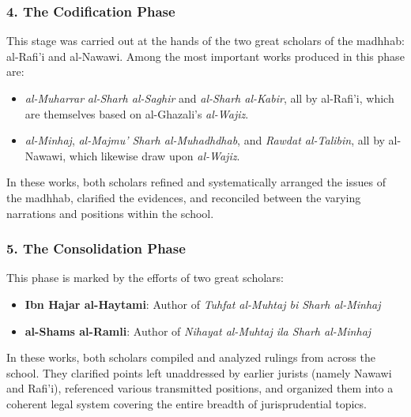 \documentclass[
  a4paper,
  DIV=11,
  numbers=noendperiod]{scrartcl}
\providecommand{\tightlist}{%
  \setlength{\itemsep}{0pt}\setlength{\parskip}{0pt}}
\begin{document}
\subsubsection{4. The Codification Phase}\label{the-codification-phase}

This stage was carried out at the hands of the two great scholars of the
madhhab: al-Rafi'i and al-Nawawi. Among the most important works
produced in this phase are:

\begin{itemize}
\tightlist
\item
  \emph{al-Muharrar} \emph{al-Sharh al-Saghir} and \emph{al-Sharh
  al-Kabir}, all by al-Rafi'i, which are themselves based on
  al-Ghazali's \emph{al-Wajiz}.
\item
  \emph{al-Minhaj}, \emph{al-Majmu' Sharh al-Muhadhdhab}, and
  \emph{Rawdat al-Talibin}, all by al-Nawawi, which likewise draw upon
  \emph{al-Wajiz}.
\end{itemize}

In these works, both scholars refined and systematically arranged the
issues of the madhhab, clarified the evidences, and reconciled between
the varying narrations and positions within the school.

\subsubsection{5. The Consolidation
Phase}\label{the-consolidation-phase}

This phase is marked by the efforts of two great scholars:

\begin{itemize}
\tightlist
\item
  \textbf{Ibn Hajar al-Haytami}: Author of \emph{Tuhfat al-Muhtaj bi
  Sharh al-Minhaj}\\
\item
  \textbf{al-Shams al-Ramli}: Author of \emph{Nihayat al-Muhtaj ila
  Sharh al-Minhaj}
\end{itemize}

In these works, both scholars compiled and analyzed rulings from across
the school. They clarified points left unaddressed by earlier jurists
(namely Nawawi and Rafi'i), referenced various transmitted positions,
and organized them into a coherent legal system covering the entire
breadth of jurisprudential topics.
\end{document}
